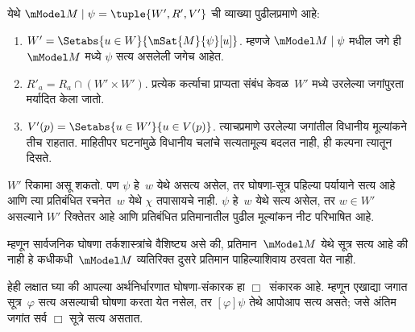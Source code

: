 \begin{defn}
\begin{enumerate}
  येथे $\mModel M \mid \psi = \tuple{W', R', V'}$ ची
  व्याख्या पुढीलप्रमाणे आहे:
  \begin{enumerate}
    \item $W' = \Setabs{ u \in W}{\mSat{M}{\psi}[u]}$.
      म्हणजे $\mModel M \mid \psi$ मधील जगे ही~$\mModel M$
      मध्ये $\psi$ सत्य असलेली जगेच आहेत.
    \item $R'_a = R_a \cap (W' \times W')$. प्रत्येक कर्त्याचा
      प्राप्यता संबंध केवळ~$W'$ मध्ये उरलेल्या जगांपुरता
      मर्यादित केला जातो.
    \item $V'(p) = \Setabs{ u \in W'}{u \in V(p) }$.
      त्याचप्रमाणे उरलेल्या जगांतील विधानीय मूल्यांकने
      तीच राहतात. माहितीपर घटनांमुळे विधानीय चलांचे
      सत्यतामूल्य बदलत नाही, ही कल्पना त्यातून दिसते.
  \end{enumerate}
  $W'$ रिकामा असू शकतो. पण $\psi$ हे~$w$ येथे असत्य
  असेल, तर घोषणा-सूत्र पहिल्या पर्यायाने सत्य आहे आणि
  त्या प्रतिबंधित रचनेत~$w$ येथे $\chi$ तपासायचे नाही.
  $\psi$ हे~$w$ येथे सत्य असेल, तर $w\in W'$ असल्याने
  $W'$ रिक्तेतर आहे आणि प्रतिबंधित प्रतिमानातील
  पुढील मूल्यांकन नीट परिभाषित आहे.

  \end{enumerate}
\end{defn}

म्हणून सार्वजनिक घोषणा तर्कशास्त्रांचे वैशिष्ट्य असे
की, प्रतिमान~$\mModel M$ येथे सूत्र सत्य आहे
की नाही हे कधीकधी~$\mModel M$ व्यतिरिक्त दुसरे
प्रतिमान पाहिल्याशिवाय ठरवता येत नाही.

हेही लक्षात घ्या की आपल्या अर्थनिर्धारणात घोषणा-संकारक
हा $\Box$~संकारक आहे. म्हणून एखाद्या जगात
सूत्र~$\varphi$ सत्य असल्याची घोषणा करता येत
नसेल, तर $[\varphi] \psi$ तेथे आपोआप सत्य असते; जसे
अंतिम जगांत सर्व $\Box$ सूत्रे सत्य असतात.

